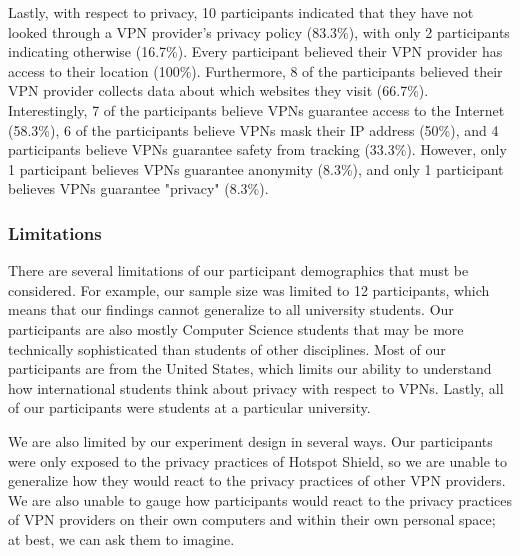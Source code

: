 Lastly, with respect to privacy, 10 participants indicated that they have not looked through a VPN provider's privacy policy (83.3\%), with only 2 participants indicating otherwise (16.7\%).
Every participant believed their VPN provider has access to their location (100\%).
Furthermore, 8 of the participants believed their VPN provider collects data about which websites they visit (66.7\%).
Interestingly, 7 of the participants believe VPNs guarantee access to the Internet (58.3\%), 6 of the participants believe VPNs mask their IP address (50\%), and 4 participants believe VPNs guarantee safety from tracking (33.3\%).
However, only 1 participant believes VPNs guarantee anonymity (8.3\%), and only 1 participant believes VPNs guarantee "privacy" (8.3\%).

\subsubsection{Limitations}
There are several limitations of our participant demographics that must be considered.
For example, our sample size was limited to 12 participants, which means that our findings cannot generalize to all university students.
Our participants are also mostly Computer Science students that may be more technically sophisticated than students of other disciplines.
Most of our participants are from the United States, which limits our ability to understand how international students think about privacy with respect to VPNs.
Lastly, all of our participants were students at a particular university.

We are also limited by our experiment design in several ways.
Our participants were only exposed to the privacy practices of Hotspot Shield, so we are unable to generalize how they would react to the privacy practices of other VPN providers.
We are also unable to gauge how participants would react to the privacy practices of VPN providers on their own computers and within their own personal space; at best, we can ask them to imagine.